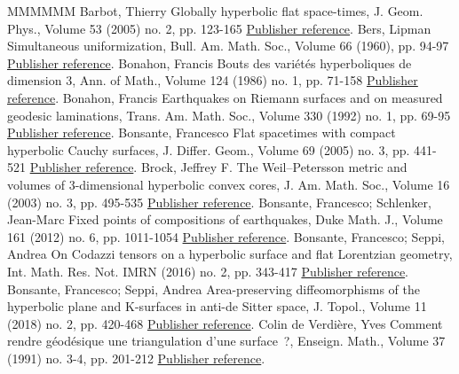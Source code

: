 \documentclass[11pt]{article}
\theoremstyle{definition}
\numberwithin{equation}{section}
\numberwithin{figure}{section}
\numberwithin{table}{section}
\begin{document}
\begin{thebibliography}{MMMMMM}
 Barbot, Thierry Globally hyperbolic flat space-times, J. Geom. Phys., Volume 53 (2005) no. 2, pp. 123-165 \href{https://ahl.centre-mersenne.org/item/AHL_2020__3__873_0/#barbot}{Publisher reference}.
 Bers, Lipman Simultaneous uniformization, Bull. Am. Math. Soc., Volume 66 (1960), pp. 94-97 \href{https://ahl.centre-mersenne.org/item/AHL_2020__3__873_0/#bers}{Publisher reference}.
 Bonahon, Francis Bouts des variétés hyperboliques de dimension 3, Ann. of Math., Volume 124 (1986) no. 1, pp. 71-158 \href{https://ahl.centre-mersenne.org/item/AHL_2020__3__873_0/#bonahonbouts}{Publisher reference}.
 Bonahon, Francis Earthquakes on Riemann surfaces and on measured geodesic laminations, Trans. Am. Math. Soc., Volume 330 (1992) no. 1, pp. 69-95 \href{https://ahl.centre-mersenne.org/item/AHL_2020__3__873_0/#bonahonearth}{Publisher reference}.
 Bonsante, Francesco Flat spacetimes with compact hyperbolic Cauchy surfaces, J. Differ. Geom., Volume 69 (2005) no. 3, pp. 441-521 \href{https://ahl.centre-mersenne.org/item/AHL_2020__3__873_0/#Bonsante}{Publisher reference}.
 Brock, Jeffrey F. The Weil–Petersson metric and volumes of 3-dimensional hyperbolic convex cores, J. Am. Math. Soc., Volume 16 (2003) no. 3, pp. 495-535 \href{https://ahl.centre-mersenne.org/item/AHL_2020__3__873_0/#BrockWPconvexcore}{Publisher reference}.
 Bonsante, Francesco; Schlenker, Jean-Marc Fixed points of compositions of earthquakes, Duke Math. J., Volume 161 (2012) no. 6, pp. 1011-1054 \href{https://ahl.centre-mersenne.org/item/AHL_2020__3__873_0/#bonschlfixed}{Publisher reference}.
 Bonsante, Francesco; Seppi, Andrea On Codazzi tensors on a hyperbolic surface and flat Lorentzian geometry, Int. Math. Res. Not. IMRN (2016) no. 2, pp. 343-417 \href{https://ahl.centre-mersenne.org/item/AHL_2020__3__873_0/#bonseppicodazzi}{Publisher reference}.
 Bonsante, Francesco; Seppi, Andrea Area-preserving diffeomorphisms of the hyperbolic plane and K-surfaces in anti-de Sitter space, J. Topol., Volume 11 (2018) no. 2, pp. 420-468 \href{https://ahl.centre-mersenne.org/item/AHL_2020__3__873_0/#ksurfaces}{Publisher reference}.
 Colin de Verdière, Yves Comment rendre géodésique une triangulation d’une surface ?, Enseign. Math., Volume 37 (1991) no. 3-4, pp. 201-212 \href{https://ahl.centre-mersenne.org/item/AHL_2020__3__873_0/#cdv}{Publisher reference}.

\end{thebibliography}
\end{document}
